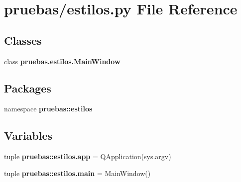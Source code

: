\section{pruebas/estilos.py \-File \-Reference}
\label{estilos_8py}
\subsection*{\-Classes}
\begin{DoxyCompactItemize}
\item 
class {\bf pruebas.\-estilos.\-Main\-Window}
\end{DoxyCompactItemize}
\subsection*{\-Packages}
\begin{DoxyCompactItemize}
\item 
namespace {\bf pruebas\-::estilos}
\end{DoxyCompactItemize}
\subsection*{\-Variables}
\begin{DoxyCompactItemize}
\item 
tuple {\bf pruebas\-::estilos.\-app} = \-Q\-Application(sys.\-argv)
\item 
tuple {\bf pruebas\-::estilos.\-main} = \-Main\-Window()
\end{DoxyCompactItemize}
